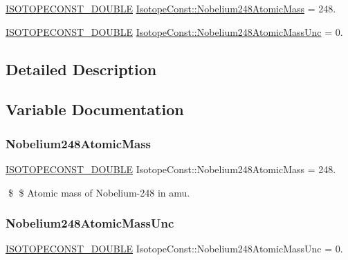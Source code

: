 \begin{DoxyCompactItemize}
\item 
\mbox{\hyperlink{group___isotope_const-_macros_ga8f45a7272ce02c0b4c65c44636ed719a}{I\+S\+O\+T\+O\+P\+E\+C\+O\+N\+S\+T\+\_\+\+D\+O\+U\+B\+LE}} \mbox{\hyperlink{group___isotope_const-_nobelium-_no248_ga0ba3c2deeb05f613587ac63ec9e0b970}{Isotope\+Const\+::\+Nobelium248\+Atomic\+Mass}} = 248.
\item 
\mbox{\hyperlink{group___isotope_const-_macros_ga8f45a7272ce02c0b4c65c44636ed719a}{I\+S\+O\+T\+O\+P\+E\+C\+O\+N\+S\+T\+\_\+\+D\+O\+U\+B\+LE}} \mbox{\hyperlink{group___isotope_const-_nobelium-_no248_ga947e39f1af8ef6c29010ffa32168838b}{Isotope\+Const\+::\+Nobelium248\+Atomic\+Mass\+Unc}} = 0.
\end{DoxyCompactItemize}


\subsection{Detailed Description}


\subsection{Variable Documentation}
\mbox{\label{group___isotope_const-_nobelium-_no248_ga0ba3c2deeb05f613587ac63ec9e0b970}} 
\subsubsection{\texorpdfstring{Nobelium248\+Atomic\+Mass}{Nobelium248AtomicMass}}
{\footnotesize\ttfamily \mbox{\hyperlink{group___isotope_const-_macros_ga8f45a7272ce02c0b4c65c44636ed719a}{I\+S\+O\+T\+O\+P\+E\+C\+O\+N\+S\+T\+\_\+\+D\+O\+U\+B\+LE}} Isotope\+Const\+::\+Nobelium248\+Atomic\+Mass = 248.}

\$ \$ Atomic mass of Nobelium-\/248 in amu. \mbox{\label{group___isotope_const-_nobelium-_no248_ga947e39f1af8ef6c29010ffa32168838b}} 
\subsubsection{\texorpdfstring{Nobelium248\+Atomic\+Mass\+Unc}{Nobelium248AtomicMassUnc}}
{\footnotesize\ttfamily \mbox{\hyperlink{group___isotope_const-_macros_ga8f45a7272ce02c0b4c65c44636ed719a}{I\+S\+O\+T\+O\+P\+E\+C\+O\+N\+S\+T\+\_\+\+D\+O\+U\+B\+LE}} Isotope\+Const\+::\+Nobelium248\+Atomic\+Mass\+Unc = 0.}

